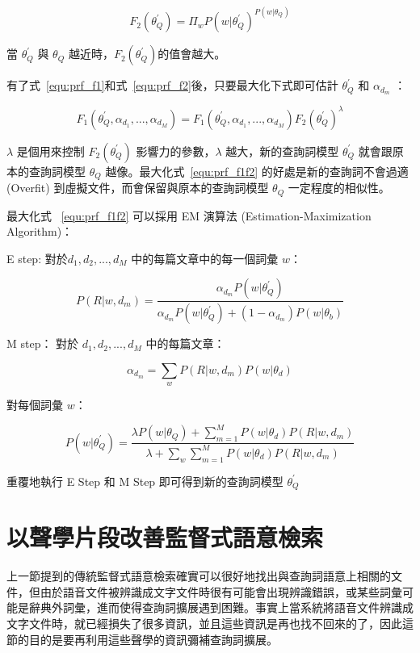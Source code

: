 \begin{equation}
\label{equ:prf_f2}
F_2(\theta_Q^{'}) = \Pi_w P(w|\theta_Q^{'})^{P(w|\theta_Q)}
\end{equation}

當 $\theta_Q^{'}$ 與 $\theta_Q$ 越近時，$F_2(\theta_Q^{'})$的值會越大。

有了式~\ref{equ:prf_f1}和式~\ref{equ:prf_f2}後，只要最大化下式即可估計 $\theta_Q^{'}$ 和 $\alpha_{d_m}$ ：

\begin{equation}
\label{equ:prf_f1f2}
F_1(\theta_Q^{'}, \alpha_{d_1}, ..., \alpha_{d_M}) = F_1(\theta_Q^{'}, \alpha_{d_1}, ..., \alpha_{d_M}) F_2(\theta_Q^{'})^\lambda
\end{equation}

$\lambda$ 是個用來控制 $F_2(\theta_Q^{'})$ 影響力的參數，$\lambda$ 越大，新的查詢詞模型 $\theta_Q^{'}$ 就會跟原本的查詢詞模型 $\theta_Q$ 越像。最大化式~\ref{equ:prf_f1f2} 的好處是新的查詢詞不會過適 (Overfit) 到虛擬文件，而會保留與原本的查詢詞模型 $\theta_Q$ 一定程度的相似性。	

最大化式 ~\ref{equ:prf_f1f2} 可以採用 EM 演算法 (Estimation-Maximization Algorithm)：

E step: 對於${d_1, d_2, ..., d_M}$ 中的每篇文章中的每一個詞彙 $w$：

\begin{equation}
\label{equ:prf_estep}
P(R|w, d_m) = \frac{\alpha_{d_m} P(w|\theta_Q^{'})}{\alpha_{d_m} P(w|\theta_Q^{'}) + (1-\alpha_{d_m}) P(w|\theta_b)}
\end{equation}

M step： 對於 ${d_1, d_2, ..., d_M}$ 中的每篇文章：

\begin{equation}
\label{equ:prf_mstep}
\alpha_{d_m} = \sum_w P(R|w, d_m)P(w|\theta_d)
\end{equation}

對每個詞彙 $w$：

\begin{equation}
P(w|\theta_Q^{'}) = \frac{\lambda P(w|\theta_Q)+\sum^M_{m=1} P(w|\theta_d) P(R|w, d_m)}{\lambda + \sum_w \sum^M_{m=1} P(w|\theta_d) P(R|w, d_m)}
\end{equation}

重覆地執行 E Step 和 M Step 即可得到新的查詢詞模型 $\theta_Q^{'}$

\section{以聲學片段改善監督式語意檢索}
上一節提到的傳統監督式語意檢索確實可以很好地找出與查詢詞語意上相關的文件，但由於語音文件被辨識成文字文件時很有可能會出現辨識錯誤，或某些詞彙可能是辭典外詞彙，進而使得查詢詞擴展遇到困難。事實上當系統將語音文件辨識成文字文件時，就已經損失了很多資訊，並且這些資訊是再也找不回來的了，因此這節的目的是要再利用這些聲學的資訊彌補查詢詞擴展。

